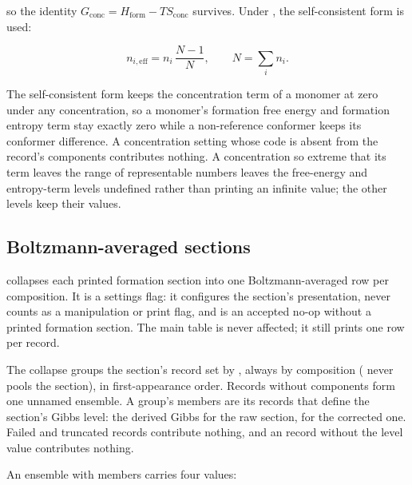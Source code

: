 so the identity $G_{\mathrm{conc}} = H_{\mathrm{form}} - T S_{\mathrm{conc}}$
survives. Under , the self-consistent form is used:

\begin{equation}
n_{i,\mathrm{eff}} = n_i\,\frac{N-1}{N},
\qquad N = \sum_i n_i .
\end{equation}

The self-consistent form keeps the concentration term of a monomer at zero
under any concentration, so a monomer's formation free energy and formation
entropy term stay exactly zero while a non-reference conformer keeps its
conformer difference. A concentration setting whose code is absent from the
record's components contributes nothing. A concentration so extreme that
its term leaves the range of representable numbers leaves the free-energy and
entropy-term levels undefined rather than printing an infinite value; the
other levels keep their values.

\subsection{Boltzmann-averaged sections}\label{sec:bavg}

 collapses each printed formation section into one
Boltzmann-averaged row per composition. It is a settings flag: it configures
the section's presentation, never counts as a manipulation or print flag, and
is an accepted no-op without a printed formation section. The main table is
never affected; it still prints one row per record.

The collapse groups the section's record set by , always by
composition ( never pools the section), in first-appearance
order. Records without components form one unnamed ensemble. A group's
members are its  records that define the section's Gibbs level: the
derived Gibbs for the raw section,  for the corrected one. Failed
and truncated records contribute nothing, and an  record without the
level value contributes nothing.

An ensemble with members carries four values:

